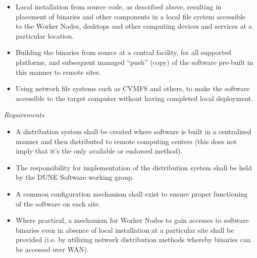 \begin{itemize}
\item Local installation from source code, as described above, resulting in placement of binaries and other components in a local file system accessible to the Worker Nodes, desktops and other computing devices and services at a particular location.

\item Building the binaries from source at a central facility, for all supported platforms, and subsequent managed ``push'' (copy) of the software pre-built in this manner to remote sites.

\item Using network file systems such as CVMFS and others, to make the software accessible to the target computer without having completed local deployment.
\end{itemize}

\noindent
\textit{Requirements}
\begin{itemize}
\item A distribution system shall be created where software is built in a centralized manner and then distributed to remote computing centers (this does not imply that it's the only available or endorsed method).

\item The responsibility for implementation of the distribution system shall be held by the DUNE Software working group.

\item A common configuration mechanism shall exist to ensure proper functioning of the software on each site.

\item Where practical, a mechanism for Worker Nodes to gain accesses to software binaries even in absence of local installation at a particular site shall be provided (i.e. by utilizing network distribution methods whereby binaries can be accessed over WAN).

\end{itemize}

